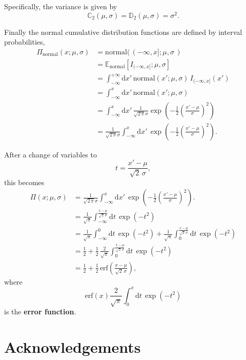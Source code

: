 \documentclass[
  letterpaper,
  DIV=11,
  numbers=noendperiod]{scrartcl}
\begin{document}
Specifically, the variance is given by \[
\mathbb{C}_{2}(\mu, \sigma)
=
\mathbb{D}_{2}(\mu, \sigma) = \sigma^{2}.
\]

Finally the normal cumulative distribution functions are defined by
interval probabilities, \begin{align*}
\Pi_{\text{normal}}(x; \mu, \sigma)
&=
\text{normal}( \, (-\infty, x]; \mu, \sigma \, )
\\
&=
\mathbb{E}_{\mathrm{normal}}[ I_{(-\infty, x]}; \mu, \sigma ]
\\
&=
\int_{-\infty}^{+\infty} \mathrm{d} x' \,
\mathrm{normal}(x'; \mu, \sigma) \, I_{(-\infty, x]}(x')
\\
&=
\int_{-\infty}^{x} \mathrm{d} x' \,
\mathrm{normal}(x'; \mu, \sigma)
\\
&=
\int_{-\infty}^{x} \mathrm{d} x' \,
\frac{1}{\sqrt{2 \, \pi} \sigma}
\exp \left(
  -\frac{1}{2} \left( \frac{x' - \mu}{\sigma} \right)^{2}
\right)
\\
&=
\frac{1}{\sqrt{2 \, \pi} \sigma}
\int_{-\infty}^{x} \mathrm{d} x' \,
\exp \left(
  -\frac{1}{2} \left( \frac{x' - \mu}{\sigma} \right)^{2}
\right).
\end{align*}

After a change of variables to \[
t = \frac{x' - \mu}{\sqrt{2} \, \sigma},
\] this becomes \begin{align*}
\Pi(x; \mu, \sigma)
&=
\frac{1}{\sqrt{2 \, \pi} \sigma}
\int_{-\infty}^{x} \mathrm{d} x' \,
\exp \left(
  -\frac{1}{2} \left( \frac{x' - \mu}{\sigma} \right)^{2}
\right).
\\
&=
\frac{1}{\sqrt{\pi}}
\int_{-\infty}^{ \frac{x - \mu}{\sqrt{2} \, \sigma} }
\mathrm{d} t \,
\exp \left( -t^{2} \right)
\\
&=
\frac{1}{\sqrt{\pi}}
\int_{-\infty}^{0} \mathrm{d} t \, \exp \left( -t^{2} \right)
+
\frac{1}{\sqrt{\pi}}
\int_{0}^{ \frac{x - \mu}{\sqrt{2} \, \sigma} } \mathrm{d} t \,
\exp \left( -t^{2} \right)
\\
&=
\frac{1}{2}
+
\frac{1}{2} \, \frac{2}{\sqrt{\pi}}
\int_{0}^{ \frac{x - \mu}{\sqrt{2} \, \sigma} } \mathrm{d} t \,
\exp \left( -t^{2} \right)
\\
&=
\frac{1}{2}
+
\frac{1}{2} \,
\mathrm{erf} \left( \frac{x - \mu}{\sqrt{2} \, \sigma} \right),
\end{align*} where \[
\mathrm{erf} (x)
\frac{2}{\sqrt{\pi}}
\int_{0}^{ x } \mathrm{d} t \, \exp \left( -t^{2} \right)
\] is the \textbf{error function}.

\section*{Acknowledgements}\label{acknowledgements}
\end{document}
